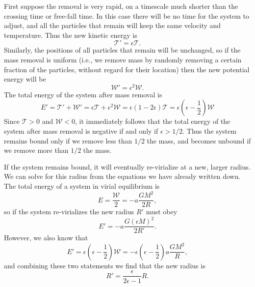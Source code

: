 First suppose the removal is very rapid, on a timescale much shorter than the crossing time or free-fall time. In this case there will be no time for the system to adjust, and all the particles that remain will keep the same velocity and temperature. Thus the new kinetic energy is
\begin{equation}
\mathcal{T}' = \epsilon \mathcal{T}.
\end{equation}
Similarly, the positions of all particles that remain will be unchanged, so if the mass removal is uniform (i.e., we remove mass by randomly removing a certain fraction of the particles, without regard for their location) then the new potential energy will be
\begin{equation}
\mathcal{W}' = \epsilon^2 \mathcal{W}.
\end{equation}
The total energy of the system after mass removal is
\begin{equation}
E' = \mathcal{T}' + \mathcal{W'} = \epsilon \mathcal{T} + \epsilon^2 \mathcal{W} = \epsilon(1-2\epsilon) \mathcal{T} = \epsilon\left(\epsilon-\frac{1}{2}\right) \mathcal{W}
\end{equation}
Since $\mathcal{T} > 0$ and $\mathcal{W} < 0$, it immediately follows that the total energy of the system after mass removal is negative if and only if $\epsilon > 1/2$. Thus the system remains bound only if we remove less than $1/2$ the mass, and becomes unbound if we remove more than $1/2$ the mass. 

If the system remains bound, it will eventually re-virialize at a new, larger radius. We can solve for this radius from the equations we have already written down. The total energy of a system in virial equilibrium is
\begin{equation}
E = \frac{\mathcal{W}}{2} = -a\frac{GM^2}{2R},
\end{equation}
so if the system re-virializes the new radius $R'$ must obey
\begin{equation}
E' = -a\frac{G(\epsilon M)^2}{2R'}.
\end{equation}
However, we also know that
\begin{equation}
E' = \epsilon\left(\epsilon-\frac{1}{2}\right) \mathcal{W} = -\epsilon\left(\epsilon-\frac{1}{2}\right)a\frac{GM^2}{R},
\end{equation}
and combining these two statements we find that the new radius is
\begin{equation}
R' = \frac{\epsilon}{2\epsilon-1} R.
\end{equation}

